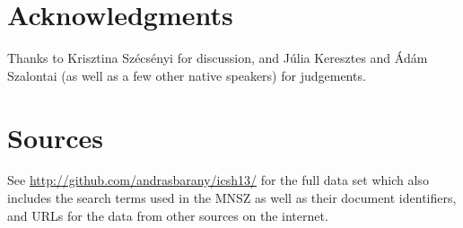 \section*{Acknowledgments}

Thanks to Krisztina Szécsényi for discussion, and Júlia Keresztes and Ádám
Szalontai (as well as a few other native speakers) for judgements.

\newrefcontext[sorting=nyt]
\printbibliography

\appendix

\section{Sources}\label{app:sources}

See \url{http://github.com/andrasbarany/icsh13/} for the full data set which
also includes the search terms used in the \gls{MNSZ} as well as their document
identifiers, and URLs for the data from other sources on the internet.


